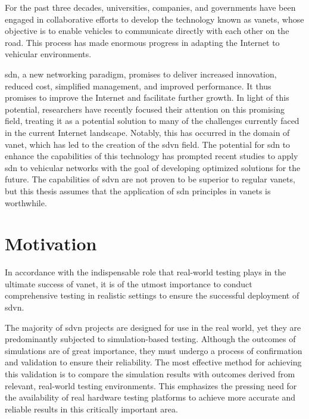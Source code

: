For the past three decades, universities, companies, and governments have been engaged in collaborative efforts to develop the technology known as \glspl{vanet}, whose objective is to enable vehicles to communicate directly with each other on the road.
This process has made enormous progress in adapting the Internet to vehicular environments. %

\gls{sdn}, a new networking paradigm, promises to deliver increased innovation, reduced cost, simplified management, and improved performance.
It thus promises to improve the Internet and facilitate further growth. In light of this potential, researchers have recently focused their attention on this promising field, treating it as a potential solution to many of the challenges currently faced in the current Internet landscape.
Notably, this has occurred in the domain of \gls{vanet}, which has led to the creation of the \gls{sdvn} field. The potential for \gls{sdn} to enhance the capabilities of this technology has prompted recent studies to apply \gls{sdn} to vehicular networks with the goal of developing optimized solutions for the future. The capabilities of \gls{sdvn} are not proven to be superior to regular \glspl{vanet}, but this thesis assumes that the application of \gls{sdn} principles in \glspl{vanet} is worthwhile.


\section{Motivation} %
\label{sec:motivation}


In accordance with the indispensable role that real-world testing plays in the ultimate success of \gls{vanet}, it is of the utmost importance to conduct comprehensive testing in realistic settings to ensure the successful deployment of \gls{sdvn}. 

The majority of \gls{sdvn} projects are designed for use in the real world, yet they are predominantly subjected to simulation-based testing. Although the outcomes of simulations are of great importance, they must undergo a process of confirmation and validation to ensure their reliability. The most effective method for achieving this validation is to compare the simulation results with outcomes derived from relevant, real-world testing environments. This emphasizes the pressing need for the availability of real hardware testing platforms to achieve more accurate and reliable results in this critically important area. 

